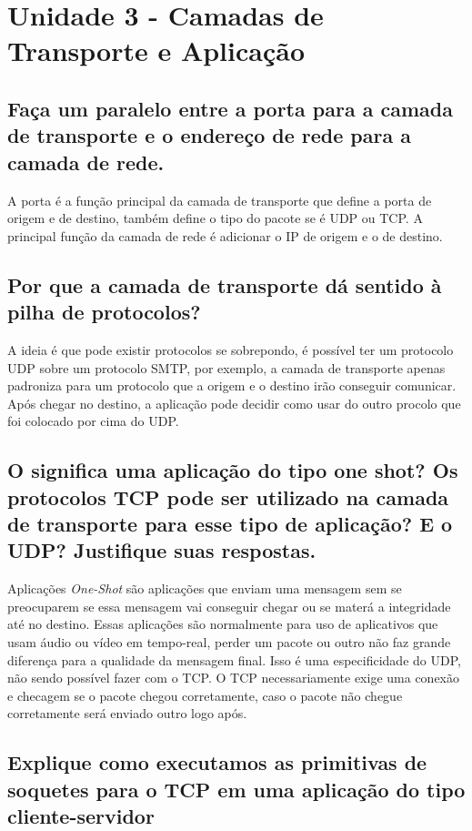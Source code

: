 \section{Unidade 3 - Camadas de Transporte e Aplicação}

\subsection{Faça um paralelo entre a porta para a camada de transporte e o endereço
de rede para a camada de rede.}

A porta é a função principal da camada de transporte que define a porta de origem e de destino, 
também define o tipo do pacote se é UDP ou TCP. A principal função da camada de rede é adicionar 
o IP de origem e o de destino.

\subsection{Por que a camada de transporte dá sentido à pilha de protocolos?}

A ideia é que pode existir protocolos se sobrepondo, é possível ter um protocolo UDP
sobre um protocolo SMTP, por exemplo, a camada de transporte apenas padroniza para um protocolo
que a origem e o destino irão conseguir comunicar. Após chegar no destino, a aplicação pode
decidir como usar do outro procolo que foi colocado por cima do UDP.

\subsection{O significa uma aplicação do tipo one shot? Os protocolos TCP pode ser
utilizado na camada de transporte para esse tipo de aplicação? E o UDP?
Justifique suas respostas.}

Aplicações \emph{One-Shot} são aplicações que enviam uma mensagem sem se preocuparem
se essa mensagem vai conseguir chegar ou se materá a integridade até no destino.
Essas aplicações são normalmente para uso de aplicativos que usam áudio ou vídeo em tempo-real,
perder um pacote ou outro não faz grande diferença para a qualidade da mensagem final.
Isso é uma especificidade do UDP, não sendo possível fazer com o TCP. O TCP necessariamente
exige uma conexão e checagem se o pacote chegou corretamente, caso o pacote não chegue corretamente
será enviado outro logo após. 

\subsection{Explique como executamos as primitivas de soquetes para o TCP em uma
aplicação do tipo cliente-servidor}


